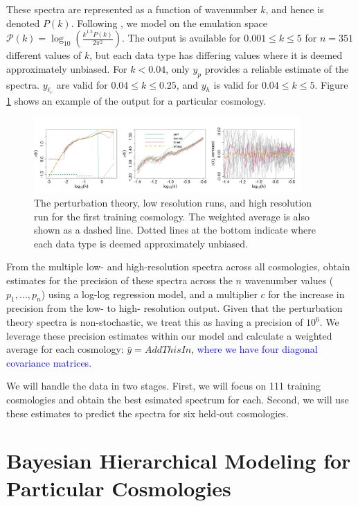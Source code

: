 \documentclass[11pt]{article}
\begin{document}
These spectra are represented as a function of wavenumber $k$, and hence is denoted $P(k)$. Following \cite{moran2023mira}, we model on the emulation space $\mathcal{P}(k)=\log_{10}\left(\frac{k^{1.5}P(k)}{2\pi^2}\right)$. The output is available for $0.001 \leq k \leq 5$ for $n=351$ different values of $k$, but each data type has differing values where it is deemed approximately unbiased. For $k<0.04$, only $y_p$ provides a reliable estimate of the spectra. $y_{\ell_r}$ are valid for $0.04 \leq k \leq 0.25$, and $y_h$ is valid for $0.04 \leq k \leq 5$. Figure \ref{fig:plot_data} shows an example of the output for a particular cosmology.

\begin{figure}[ht]
    \centering
    \includegraphics[width=4in]{plot_data.png}
    \caption{The perturbation theory, low resolution runs, and high resolution run for the first training cosmology. The weighted average is also shown as a dashed line. Dotted lines at the bottom indicate where each data type is deemed approximately unbiased.}
    \label{fig:plot_data}
\end{figure}

From the multiple low- and high-resolution spectra across all cosmologies, \cite{moran2023mira} obtain estimates for the precision of these spectra across the $n$ wavenumber values ($p_1,\dots,p_n$) using a log-log regression model, and a multiplier $c$ for the increase in precision from the low- to high- resolution output. Given that the perturbation theory spectra is non-stochastic, we treat this as having a precision of $10^6$. We leverage these precision estimates within our model and calculate a weighted average for each cosmology: $\bar y = AddThisIn$, \textcolor{blue}{where we have four diagonal covariance matrices.}

We will handle the data in two stages.  First, we will focus on 111 training cosmologies and obtain the best esimated spectrum for each.  Second, we will use these estimates to predict the spectra for six held-out cosmologies.

\section{Bayesian Hierarchical Modeling for Particular Cosmologies}
\label{sec:hm_fit}
\end{document}
